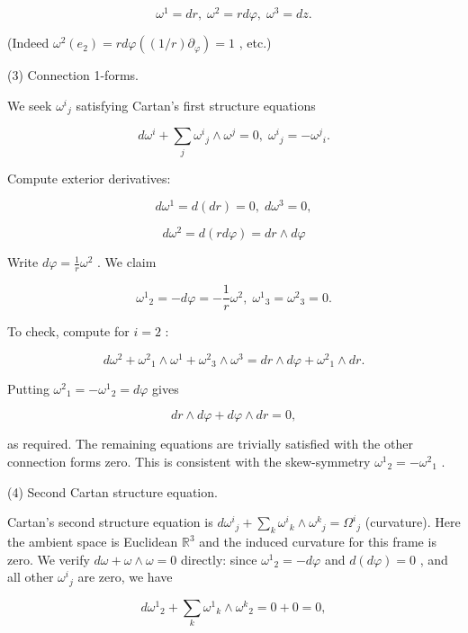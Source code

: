 \documentclass[10pt]{article}
\begin{document}
\[
{\omega }^{1} = {dr},\;{\omega }^{2} = {rd\varphi },\;{\omega }^{3} = {dz}.
\]

(Indeed \({\omega }^{2}\left( {e}_{2}\right)  = {rd\varphi }\left( {\left( {1/r}\right) {\partial }_{\varphi }}\right)  = 1\) , etc.)

(3) Connection 1-forms.

We seek \({\omega }^{i}{}_{j}\) satisfying Cartan’s first structure equations

\[
d{\omega }^{i} + \mathop{\sum }\limits_{j}{\omega }^{i}{}_{j} \land  {\omega }^{j} = 0,\;{\omega }^{i}{}_{j} =  - {\omega }^{j}{}_{i}.
\]

Compute exterior derivatives:

\[
d{\omega }^{1} = d\left( {dr}\right)  = 0,\;d{\omega }^{3} = 0,
\]

\[
d{\omega }^{2} = d\left( {rd\varphi }\right)  = {dr} \land  {d\varphi }
\]

Write \({d\varphi } = \frac{1}{r}{\omega }^{2}\) . We claim

\[
{\omega }^{1}{}_{2} =  - {d\varphi } =  - \frac{1}{r}{\omega }^{2},\;{\omega }^{1}{}_{3} = {\omega }^{2}{}_{3} = 0.
\]

To check, compute for \(i = 2\) :

\[
d{\omega }^{2} + {\omega }^{2}{}_{1} \land  {\omega }^{1} + {\omega }^{2}{}_{3} \land  {\omega }^{3} = {dr} \land  {d\varphi } + {\omega }^{2}{}_{1} \land  {dr}.
\]

Putting \({\omega }^{2}{}_{1} =  - {\omega }^{1}{}_{2} = {d\varphi }\) gives

\[
{dr} \land  {d\varphi } + {d\varphi } \land  {dr} = 0,
\]

as required. The remaining equations are trivially satisfied with the other connection forms zero. This is consistent with the skew-symmetry \({\omega }^{1}{}_{2} =  - {\omega }^{2}{}_{1}\) .

(4) Second Cartan structure equation.

Cartan’s second structure equation is \(d{\omega }^{i}{}_{j} + \mathop{\sum }\limits_{k}{\omega }^{i}{}_{k} \land  {\omega }^{k}{}_{j} = {\Omega }^{i}{}_{j}\) (curvature). Here the ambient space is Euclidean \({\mathbb{R}}^{3}\) and the induced curvature for this frame is zero. We verify \({d\omega } + \omega  \land  \omega  = 0\) directly: since \({\omega }^{1}{}_{2} =  - {d\varphi }\) and \(d\left( {d\varphi }\right)  = 0\) , and all other \({\omega }^{i}{}_{j}\) are zero, we have

\[
d{\omega }^{1}{}_{2} + \mathop{\sum }\limits_{k}{\omega }^{1}{}_{k} \land  {\omega }^{k}{}_{2} = 0 + 0 = 0,
\]
\end{document}
